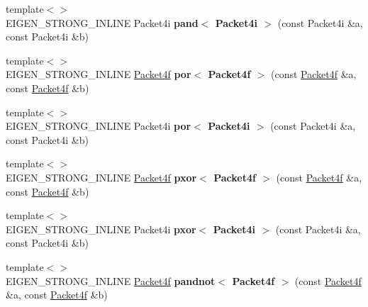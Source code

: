 \begin{DoxyCompactItemize}
\item 
\mbox{\label{namespace_eigen_1_1internal_acaff78969deba7b5ad84b29634b0428b}} 
{\footnotesize template$<$$>$ }\\E\+I\+G\+E\+N\+\_\+\+S\+T\+R\+O\+N\+G\+\_\+\+I\+N\+L\+I\+NE Packet4i {\bfseries pand$<$ Packet4i $>$} (const Packet4i \&a, const Packet4i \&b)
\item 
\mbox{\label{namespace_eigen_1_1internal_a4fb4f0998cd8b159ab05449459d3ce56}} 
{\footnotesize template$<$$>$ }\\E\+I\+G\+E\+N\+\_\+\+S\+T\+R\+O\+N\+G\+\_\+\+I\+N\+L\+I\+NE \hyperlink{struct_eigen_1_1internal_1_1_packet4f}{Packet4f} {\bfseries por$<$ Packet4f $>$} (const \hyperlink{struct_eigen_1_1internal_1_1_packet4f}{Packet4f} \&a, const \hyperlink{struct_eigen_1_1internal_1_1_packet4f}{Packet4f} \&b)
\item 
\mbox{\label{namespace_eigen_1_1internal_a1b9b1518331541832dbd38f5b9f575eb}} 
{\footnotesize template$<$$>$ }\\E\+I\+G\+E\+N\+\_\+\+S\+T\+R\+O\+N\+G\+\_\+\+I\+N\+L\+I\+NE Packet4i {\bfseries por$<$ Packet4i $>$} (const Packet4i \&a, const Packet4i \&b)
\item 
\mbox{\label{namespace_eigen_1_1internal_ab0a58ebc61dd0462933b4596c80eb2c9}} 
{\footnotesize template$<$$>$ }\\E\+I\+G\+E\+N\+\_\+\+S\+T\+R\+O\+N\+G\+\_\+\+I\+N\+L\+I\+NE \hyperlink{struct_eigen_1_1internal_1_1_packet4f}{Packet4f} {\bfseries pxor$<$ Packet4f $>$} (const \hyperlink{struct_eigen_1_1internal_1_1_packet4f}{Packet4f} \&a, const \hyperlink{struct_eigen_1_1internal_1_1_packet4f}{Packet4f} \&b)
\item 
\mbox{\label{namespace_eigen_1_1internal_a571f141e28e911ac6e855018bfc00bb1}} 
{\footnotesize template$<$$>$ }\\E\+I\+G\+E\+N\+\_\+\+S\+T\+R\+O\+N\+G\+\_\+\+I\+N\+L\+I\+NE Packet4i {\bfseries pxor$<$ Packet4i $>$} (const Packet4i \&a, const Packet4i \&b)
\item 
\mbox{\label{namespace_eigen_1_1internal_a00bb122bef7ee702b6300fc47db1fadf}} 
{\footnotesize template$<$$>$ }\\E\+I\+G\+E\+N\+\_\+\+S\+T\+R\+O\+N\+G\+\_\+\+I\+N\+L\+I\+NE \hyperlink{struct_eigen_1_1internal_1_1_packet4f}{Packet4f} {\bfseries pandnot$<$ Packet4f $>$} (const \hyperlink{struct_eigen_1_1internal_1_1_packet4f}{Packet4f} \&a, const \hyperlink{struct_eigen_1_1internal_1_1_packet4f}{Packet4f} \&b)

\end{DoxyCompactItemize}
